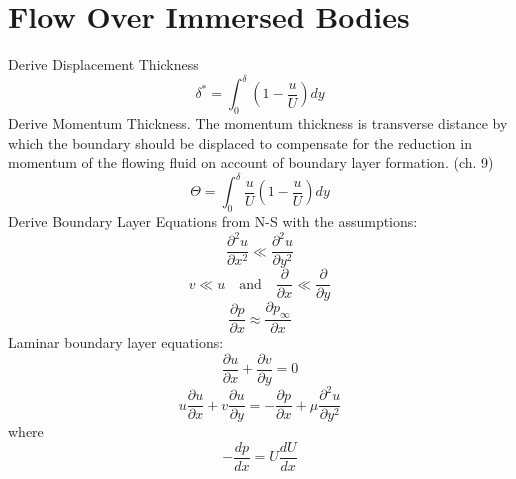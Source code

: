 \documentclass{article}
\begin{document}
%
%
\newpage
\section{Flow Over Immersed Bodies}

Derive Displacement Thickness
\begin{equation}
  \delta^* = \int_0^\delta (1-\frac{u}{U})dy
\end{equation}
\newline
\newline
Derive Momentum Thickness. The momentum thickness is transverse distance by which the boundary should be displaced to compensate for the reduction in momentum of the flowing fluid on account of boundary layer formation. (ch. 9)
\begin{equation}
  \Theta = \int_0^\delta \frac{u}{U}(1-\frac{u}{U})dy
\end{equation}
\newline
\newline
Derive Boundary Layer Equations from N-S with the assumptions:
\begin{equation}
  \frac{\partial^2 u}{\partial x^2} \ll \frac{\partial^2 u}{\partial y^2}
\end{equation}
\begin{equation}
  v \ll u\quad\text{and}\quad\frac{\partial}{\partial x} \ll \frac{\partial}{\partial y}
\end{equation}
\begin{equation}
  \frac{\partial p}{\partial x} \approx \frac{\partial p_\infty}{\partial x}
\end{equation}
\newline
\newline
Laminar boundary layer equations: 
\begin{equation}
  \frac{\partial u}{\partial x} + \frac{\partial v}{\partial y} = 0
\end{equation}
\begin{equation}
  u\frac{\partial u}{\partial x} + v\frac{\partial u}{\partial y} = -\frac{\partial p}{\partial x} + \mu\frac{\partial^2 u}{\partial y^2}
\end{equation}
where
\begin{equation}
  -\frac{d p}{d x} = U \frac{d U}{d x}
\end{equation}
\newline
\newline
\end{document}
